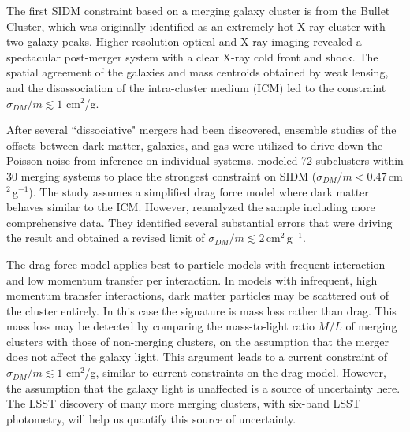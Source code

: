 
The first SIDM constraint based on a merging galaxy cluster is from the Bullet Cluster, which was originally identified as an extremely hot X-ray cluster with two galaxy peaks. Higher resolution optical and X-ray imaging revealed a spectacular post-merger system with a clear X-ray cold front and shock. The spatial agreement of the galaxies and mass centroids obtained by weak lensing, and the disassociation of the intra-cluster medium (ICM) led to the constraint $\sigma_{DM}/m \lesssim 1$ cm$^2$/g. 

After several ``dissociative" mergers had been discovered, ensemble studies of the offsets between dark matter, galaxies, and gas were utilized to drive down the Poisson noise from inference on individual systems. \citet{1503.07675} modeled 72 subclusters within 30 merging systems to place the strongest constraint on SIDM ($\sigma_{DM}/m<0.47$\,cm$^{2}$\,g$^{-1}$).
The study assumes a simplified drag force model where dark matter behaves similar to the ICM. However, \citet{1701.05877} reanalyzed the sample including more comprehensive data. They identified several substantial errors that were driving the result and obtained a revised limit of $\sigma_{DM}/m\lesssim 2$\,cm$^{2}$\,g$^{-1}$.

The drag force model applies best to particle models with frequent interaction and low momentum transfer per interaction. In models with infrequent, high  momentum transfer interactions, dark matter particles may be scattered out of the cluster entirely. In this case the signature is mass loss rather than drag. This mass loss may be detected by comparing the mass-to-light ratio $M/L$ of merging clusters with those of non-merging clusters, on the assumption that the merger does not affect the galaxy light. This argument leads to a current constraint of $\sigma_{DM}/m \lesssim 1$ cm$^2$/g, similar to current constraints on the drag model. However, the assumption that the galaxy light is unaffected is a source of uncertainty here. The LSST discovery of many more merging clusters, with six-band LSST photometry, will help us quantify this source of uncertainty. 

